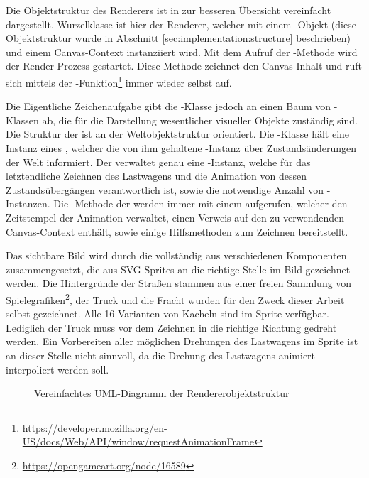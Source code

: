 Die Objektstruktur des Renderers ist in  zur besseren Übersicht vereinfacht dargestellt. Wurzelklasse ist hier der Renderer, welcher mit einem -Objekt (diese Objektstruktur wurde in Abschnitt \ref{sec:implementation:structure} beschrieben) und einem Canvas-Context instanziiert wird. Mit dem Aufruf der -Methode wird der Render-Prozess gestartet. Diese Methode zeichnet den Canvas-Inhalt und ruft sich mittels der -Funktion\footnote{\url{https://developer.mozilla.org/en-US/docs/Web/API/window/requestAnimationFrame}} immer wieder selbst auf.

Die Eigentliche Zeichenaufgabe gibt die -Klasse jedoch an einen Baum von -Klassen ab, die für die Darstellung wesentlicher visueller Objekte zuständig sind. Die Struktur der  ist an der Weltobjektstruktur orientiert. Die -Klasse hält eine Instanz eines , welcher die von ihm gehaltene -Instanz über Zustandsänderungen der Welt informiert. Der  verwaltet genau eine -Instanz, welche für das letztendliche Zeichnen des Lastwagens und die Animation von dessen Zustandsübergängen verantwortlich ist, sowie die notwendige Anzahl von -Instanzen. Die -Methode der  werden immer mit einem  aufgerufen, welcher den Zeitstempel der Animation verwaltet, einen Verweis auf den zu verwendenden Canvas-Context enthält, sowie einige Hilfsmethoden zum Zeichnen bereitstellt.

Das sichtbare Bild wird durch die  vollständig aus verschiedenen Komponenten zusammengesetzt, die aus SVG-Sprites an die richtige Stelle im Bild gezeichnet werden. Die Hintergründe der Straßen stammen aus einer freien Sammlung von Spielegrafiken\footnote{\url{https://opengameart.org/node/16589}}, der Truck und die Fracht wurden für den Zweck dieser Arbeit selbst gezeichnet. Alle 16 Varianten von Kacheln sind im Sprite verfügbar. Lediglich der Truck muss vor dem Zeichnen in die richtige Richtung gedreht werden. Ein Vorbereiten aller möglichen Drehungen des Lastwagens im Sprite ist an dieser Stelle nicht sinnvoll, da die Drehung des Lastwagens animiert interpoliert werden soll.

\begin{figure}
  
  \caption{Vereinfachtes UML-Diagramm der Rendererobjektstruktur}
  \label{sec:implementation:rendering:structure:uml}
\end{figure}

